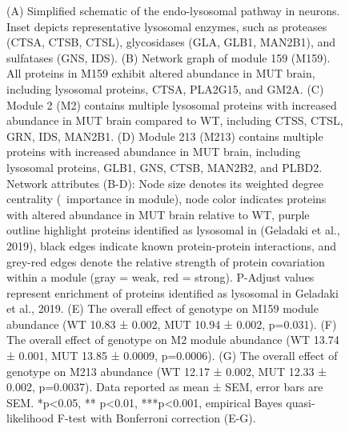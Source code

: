 \begin{figure}[!ht]
	\begin{fullwidth}
	\begin{center}
	\captionsetup{labelformat=adja-page}
	\ContinuedFloat
	\caption{
		(A) Simplified schematic of the endo-lysosomal pathway in neurons. Inset depicts
		representative lysosomal enzymes, such as proteases (CTSA, CTSB, CTSL),
		glycosidases (GLA, GLB1, MAN2B1), and sulfatases (GNS, IDS).  
		(B) Network graph of module 159 (M159). All proteins in M159 exhibit altered
		abundance in MUT brain, including lysosomal proteins, CTSA, PLA2G15, and GM2A. 
		(C) Module 2 (M2) contains multiple lysosomal proteins with increased abundance
		in MUT brain compared to WT, including CTSS, CTSL, GRN, IDS, MAN2B1. 
		(D) Module 213 (M213) contains multiple proteins with increased abundance in MUT
		brain, including lysosomal proteins, GLB1, GNS, CTSB, MAN2B2, and PLBD2. Network
		attributes (B-D): Node size denotes its weighted degree centrality (~importance
		in module),  node color indicates proteins with altered abundance in MUT brain
		relative to WT, purple outline highlight proteins identified as lysosomal in
		(Geladaki et al., 2019), black edges indicate known protein-protein
		interactions, and grey-red edges denote the relative strength of protein
		covariation within a module (gray = weak, red = strong). P-Adjust values
		represent enrichment of proteins identified as lysosomal in Geladaki et al.,
		2019. 
		(E) The overall effect of genotype on M159 module abundance (WT 10.83 ± 0.002,
		MUT 10.94 ± 0.002, p=0.031). 
		(F) The overall effect of genotype on M2 module abundance (WT 13.74 ± 0.001, MUT
		13.85 ± 0.0009, p=0.0006). 
		(G) The overall effect of genotype on M213 abundance (WT 12.17 ± 0.002, MUT
		12.33 ± 0.002, p=0.0037). Data reported as mean ± SEM, error bars are SEM.
		*p<0.05, ** p<0.01, ***p<0.001, empirical Bayes quasi-likelihood F-test with
		Bonferroni correction (E-G).
	}
	\label{fig:fig3}
	\end{center}
	\end{fullwidth}
\end{figure}


